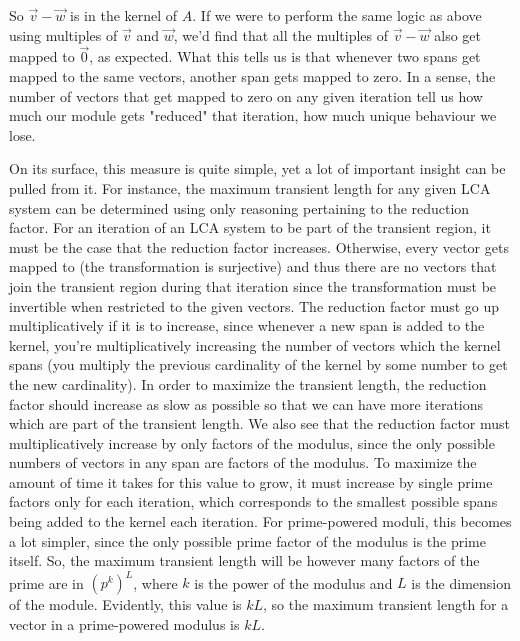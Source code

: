 \documentclass[a4paper, 12pt, reqno]{amsart}
\begin{document}
		So $\vec{v} - \vec{w}$ is in the kernel of $A$. If we were to perform the same logic as above using
		multiples of $\vec{v}$ and $\vec{w}$, we'd find that all the multiples of $\vec{v} - \vec{w}$ also
		get mapped to $\vec{0}$, as expected. What this tells us is that whenever two spans get mapped to 
		the same vectors, another span gets mapped to zero. In a sense, the number of vectors that get mapped
		to zero on any given iteration tell us how much our module gets "reduced" that iteration, how much
		unique behaviour we lose.
		
		On its surface, this measure is quite simple, yet a lot of important insight can be pulled from it.
		For instance, the maximum transient length for any given LCA system can be determined using only
		reasoning pertaining to the reduction factor. For an iteration of an LCA system to be part of the
		transient region, it must be the case that the reduction factor increases. Otherwise, every vector
		gets mapped to (the transformation is surjective) and thus there are no vectors that join the transient 
		region during that iteration since the transformation must be invertible when restricted to the given
		vectors. The reduction factor must go up multiplicatively if it is to increase, since whenever a new span
		is added to the kernel, you're multiplicatively increasing the number of vectors which the kernel spans
		(you multiply the previous cardinality of the kernel by some number to get the new cardinality). In order to 
		maximize the transient length, the reduction factor should increase as slow as possible so that we can have
		more iterations which are part of the transient length. We also see that the reduction factor must 
		multiplicatively increase by only factors of the modulus, since the only possible numbers of vectors in any
		span are factors of the modulus. To maximize the amount of time it takes for this value to grow, it must 
		increase by single prime factors only for each iteration, which corresponds to the smallest possible spans
		being added to the kernel each iteration. For prime-powered moduli, this becomes a lot simpler, since the 
		only possible prime factor of the modulus is the prime itself. So, the maximum transient length will be 
		however many factors of the prime are in $(p^{k})^L$, where $k$ is the power of the modulus and $L$ is the 
		dimension of the module. Evidently, this value is $kL$, so the maximum transient length for a vector in a 
		prime-powered modulus is $kL$.
		
\end{document}
